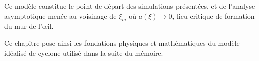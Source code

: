 Ce mod\`ele constitue le point de d\'epart des simulations pr\'esent\'ees, et de l'analyse asymptotique men\'ee au voisinage de $\xi_m$ o\`u $a(\xi) \to 0$, lieu critique de formation du mur de l'\oe il.

\medskip

Ce chapitre pose ainsi les fondations physiques et math\'ematiques du mod\`ele id\'ealis\'e de cyclone utilis\'e dans la suite du m\'emoire.
